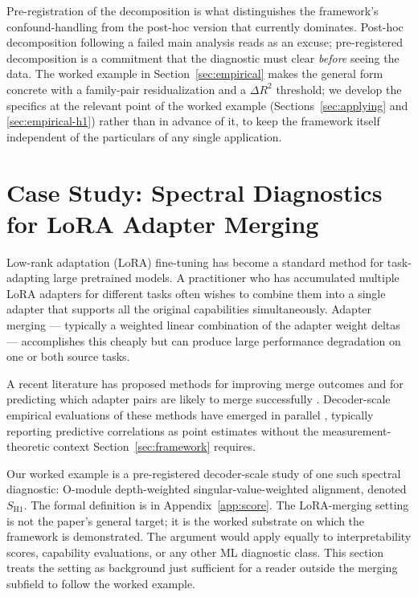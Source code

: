 \documentclass[10pt]{article}
\begin{document}
Pre-registration of the decomposition is what distinguishes the
framework's confound-handling from the post-hoc version that
currently dominates. Post-hoc decomposition following a failed main
analysis reads as an excuse; pre-registered decomposition is a
commitment that the diagnostic must clear \emph{before} seeing the
data. The worked example in Section~\ref{sec:empirical} makes the
general form concrete with a family-pair residualization and a
$\Delta R^2$ threshold; we develop the specifics at the relevant
point of the worked example (Sections~\ref{sec:applying} and
\ref{sec:empirical-h1}) rather than in advance of it, to keep the
framework itself independent of the particulars of any single
application.

\section{Case Study: Spectral Diagnostics for LoRA Adapter Merging}
\label{sec:case-study}

Low-rank adaptation (LoRA) fine-tuning \citep{hu2021lora} has become
a standard method for task-adapting large pretrained models. A
practitioner who has accumulated multiple LoRA adapters for different
tasks often wishes to combine them into a single adapter that
supports all the original capabilities simultaneously. Adapter
merging --- typically a weighted linear combination of the adapter
weight deltas --- accomplishes this cheaply but can produce large
performance degradation on one or both source tasks.

A recent literature has proposed methods for improving merge
outcomes \citep{stoica2024knots,gargiulo2025tsv,li2026svc,
zhang2025osrm} and for predicting which adapter pairs are likely to
merge successfully \citep{zhou2026demystifying,rahamim2026mergeability,
bolton2026simmerge}. Decoder-scale empirical evaluations of these
methods have emerged in parallel \citep{hitit2026insystematic,
he2025mergebench}, typically reporting predictive correlations as
point estimates without the measurement-theoretic context
Section~\ref{sec:framework} requires.

Our worked example is a pre-registered decoder-scale study of one
such spectral diagnostic: O-module depth-weighted
singular-value-weighted alignment, denoted $S_{\mathrm{H1}}$. The
formal definition is in Appendix~\ref{app:score}. The LoRA-merging
setting is not the paper's general target; it is the worked
substrate on which the framework is demonstrated. The argument
would apply equally to interpretability scores, capability
evaluations, or any other ML diagnostic class. This section treats
the setting as background just sufficient for a reader outside the
merging subfield to follow the worked example.
\end{document}
